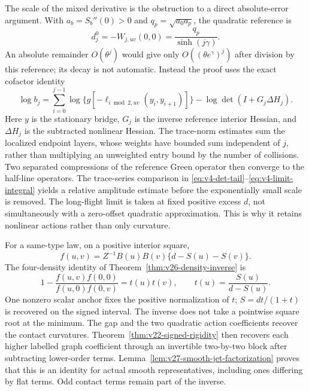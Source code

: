 The scale of the mixed derivative is the obstruction to a direct
absolute-error argument.  With $a_b=S_b''(0)>0$ and
$q_p=\sqrt{a_0a_p}$, the quadratic reference is
\begin{equation}\label{eq:v50-reference-scale}
 d_j^0=-W_{j,uv}(0,0)=\frac{q_p}{\sinh(j\gamma)}.
\end{equation}
An absolute remainder $O(\theta^j)$ would give only
$O((\theta e^\gamma)^j)$ after division by this reference; its
decay is not automatic.  Instead the proof uses the exact cofactor
identity
\begin{equation}\label{eq:v50-relative-log}
 \log b_j=\sum_{i=0}^{j-1}
 \log\{g[-\ell_{i\bmod2,uv}(y_i,y_{i+1})]\}
                   -\log\det(I+G_j\Delta H_j).
\end{equation}
Here $y$ is the stationary bridge, $G_j$ is the inverse reference
interior Hessian, and $\Delta H_j$ is the subtracted nonlinear
Hessian.  The trace-norm estimates sum the localized endpoint layers,
whose weights have bounded sum independent of $j$, rather than
multiplying an unweighted entry bound by the number of collisions.
Two separated compressions of the reference Green operator then
converge to the half-line operators.  The trace-series comparison in
\eqref{eq:v4-det-tail}--\eqref{eq:v4-limit-integral} yields a
relative amplitude estimate before the exponentially small scale is
removed.  The long-flight limit is taken at fixed positive excess
$d$, not simultaneously with a zero-offset quadratic approximation.
This is why it retains nonlinear actions rather than only curvature.

For a same-type law, on a positive interior square,
\[
 f(u,v)=Z^{-1}B(u)B(v)\{d-S(u)-S(v)\}.
\]
The four-density identity of Theorem~\ref{thm:v26-density-inverse} is
\[
 1-\frac{f(u,v)f(0,0)}{f(u,0)f(0,v)}=t(u)t(v),\qquad
 t(u)=\frac{S(u)}{d-S(u)}.
\]
One nonzero scalar anchor fixes the positive normalization of $t$;
$S=dt/(1+t)$ is recovered on the signed interval.  The inverse does
not take a pointwise square root at the minimum.  The gap and the two
quadratic action coefficients recover the contact curvatures.
Theorem~\ref{thm:v22-signed-rigidity} then recovers each higher labelled
graph coefficient through an invertible two-by-two block after subtracting
lower-order terms.  Lemma~\ref{lem:v27-smooth-jet-factorization} proves
that this is an identity for actual smooth representatives, including
ones differing by flat terms.  Odd contact terms remain part of the
inverse.

